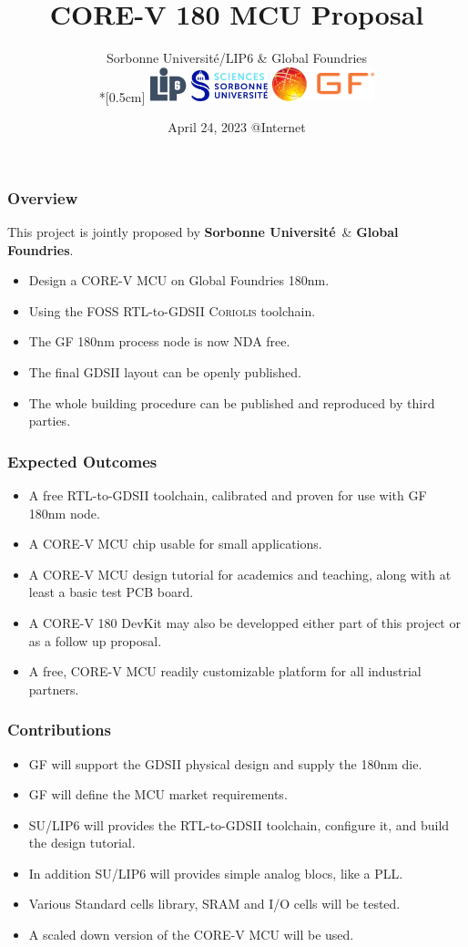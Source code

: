\documentclass[10pt,aspectratio=169,presentation]{beamer}
\title{CORE-V 180 MCU Proposal}
\author[J.-P. \Chaput]{Sorbonne Université/LIP6 \& Global Foundries \\*[0.5cm]
                          \includegraphics[height=1.0cm]{./images/Logo-LIP6-bleugris}\hspace{0.5cm}
                          \includegraphics[height=0.9cm]{./images/Logo-SU}           \hspace{0.5cm}
                          \includegraphics[height=1.0cm]{./images/GFonly-ORANGE-letters}%
                         }
\institute[SU-LIP6]{ \texttt{Jean-Paul.Chaput@lip6.fr} }
\date[April 24, 2023]{April 24, 2023 @Internet}
\newcommand {\NDA}           {\textsc{NDA}\xspace}
\newcommand {\Coriolis}      {\textsc{Coriolis}\xspace}
\newcommand {\GDSII}         {\textsc{GDSII}\xspace}
\begin{document}
   \titlepage


   \begin{frame}
     \frametitle{Overview}
     This project is jointly proposed by \textbf{Sorbonne Université}\ \& \textbf{Global Foundries}.
     \vspace*{\baselineskip}
     \begin{itemize}
       \setlength\itemsep{1.0\baselineskip}
       \item Design a CORE-V MCU on Global Foundries 180nm.
       \item Using the FOSS RTL-to-GDSII \Coriolis toolchain.
       \item The GF 180nm process node is now \NDA free.
       \item The final \GDSII layout can be openly published.
       \item The whole building procedure can be published and
             reproduced by third parties.
     \end{itemize}
   \end{frame}


   \begin{frame}
     \frametitle{Expected Outcomes}
     \begin{itemize}
       \setlength\itemsep{1.0\baselineskip}
       \item A free  RTL-to-GDSII toolchain, calibrated and proven for use
             with GF 180nm node.
       \item A CORE-V MCU chip usable for small applications. 
       \item A CORE-V MCU design tutorial for academics and teaching,
             along with at least a basic test PCB board.
       \item A CORE-V 180 DevKit may also be developped either part of this
             project or as a follow up proposal.
       \item A free, CORE-V MCU readily customizable platform for all
             industrial partners.
     \end{itemize}
   \end{frame}


   \begin{frame}
     \frametitle{Contributions}
     \begin{itemize}
       \setlength\itemsep{1.0\baselineskip}
       \item GF will support the GDSII physical design and supply the 180nm die.
       \item GF will define the MCU market requirements.
       \item SU/LIP6 will provides the RTL-to-GDSII toolchain, configure it,
             and build the design tutorial.
       \item In addition SU/LIP6 will provides simple analog blocs, like a PLL.
       \item Various Standard cells library, SRAM and I/O cells will be tested.
       \item A scaled down version of the CORE-V MCU will be used.
     \end{itemize}
   \end{frame}
\end{document}
